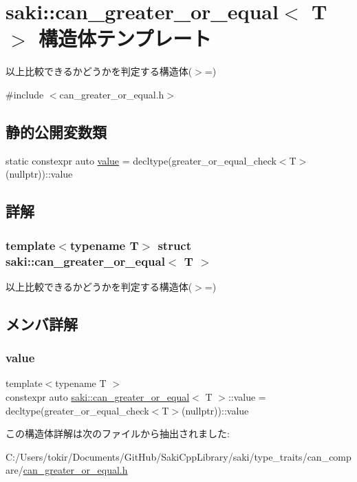 \hypertarget{structsaki_1_1can__greater__or__equal}{}\section{saki\+:\+:can\+\_\+greater\+\_\+or\+\_\+equal$<$ T $>$ 構造体テンプレート}
\label{structsaki_1_1can__greater__or__equal}


以上比較できるかどうかを判定する構造体($>$=)  




{\ttfamily \#include $<$can\+\_\+greater\+\_\+or\+\_\+equal.\+h$>$}

\subsection*{静的公開変数類}
\begin{DoxyCompactItemize}
\item 
static constexpr auto \mbox{\hyperlink{structsaki_1_1can__greater__or__equal_a33bdce8a91412add2b2c1a3f4635fb31}{value}} = decltype(greater\+\_\+or\+\_\+equal\+\_\+check$<$T$>$(nullptr))\+::value
\end{DoxyCompactItemize}


\subsection{詳解}
\subsubsection*{template$<$typename T$>$\newline
struct saki\+::can\+\_\+greater\+\_\+or\+\_\+equal$<$ T $>$}

以上比較できるかどうかを判定する構造体($>$=) 

\subsection{メンバ詳解}
\mbox{\label{structsaki_1_1can__greater__or__equal_a33bdce8a91412add2b2c1a3f4635fb31}} 
\subsubsection{\texorpdfstring{value}{value}}
{\footnotesize\ttfamily template$<$typename T $>$ \\
constexpr auto \mbox{\hyperlink{structsaki_1_1can__greater__or__equal}{saki\+::can\+\_\+greater\+\_\+or\+\_\+equal}}$<$ T $>$\+::value = decltype(greater\+\_\+or\+\_\+equal\+\_\+check$<$T$>$(nullptr))\+::value\hspace{0.3cm}{\ttfamily [static]}}



この構造体詳解は次のファイルから抽出されました\+:\begin{DoxyCompactItemize}
\item 
C\+:/\+Users/tokir/\+Documents/\+Git\+Hub/\+Saki\+Cpp\+Library/saki/type\+\_\+traits/can\+\_\+compare/\mbox{\hyperlink{can__greater__or__equal_8h}{can\+\_\+greater\+\_\+or\+\_\+equal.\+h}}\end{DoxyCompactItemize}
